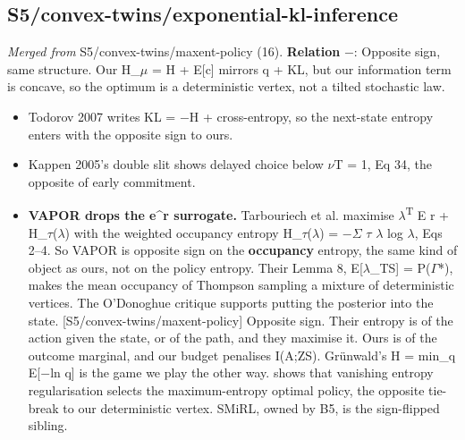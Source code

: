 \documentclass[10pt]{article}
\begin{document}
\subsection{S5/convex-twins/exponential-kl-inference}\label{node:S5-S5-convex-twins-exponential-kl-inference}
\textit{Merged from} S5/convex-twins/maxent-policy (16). \textbf{Relation} $-$: Opposite sign, same structure. Our H\_\ensuremath{\mu} = H + E[c] mirrors q + KL, but our information term is concave, so the optimum is a deterministic vertex, not a tilted stochastic law.
\begin{itemize}[nosep,leftmargin=1.2em]
\item Todorov 2007 writes KL = \ensuremath{-}H + cross-entropy, so the next-state entropy enters with the opposite sign to ours.
\item Kappen 2005's double slit shows delayed choice below \ensuremath{\nu}T = 1, Eq 34, the opposite of early commitment.
\item \textbf{VAPOR drops the e\^{}r surrogate.} Tarbouriech et al. maximise \ensuremath{\lambda}\textsuperscript{T} E r + H\_\ensuremath{\tau}(\ensuremath{\lambda}) with the weighted occupancy entropy H\_\ensuremath{\tau}(\ensuremath{\lambda}) = \ensuremath{-}\ensuremath{\Sigma} \ensuremath{\tau} \ensuremath{\lambda} log \ensuremath{\lambda}, Eqs 2--4. So VAPOR is opposite sign on the \textbf{occupancy} entropy, the same kind of object as ours, not on the policy entropy. Their Lemma 8, E[\ensuremath{\lambda}\_TS] = P(\ensuremath{\Gamma}*), makes the mean occupancy of Thompson sampling a mixture of deterministic vertices. The O'Donoghue critique supports putting the posterior into the state. [S5/convex-twins/maxent-policy] Opposite sign. Their entropy is of the action given the state, or of the path, and they maximise it. Ours is of the outcome marginal, and our budget penalises I(A;Z\textbar{}S). Gr\"unwald's H = min\_q E[\ensuremath{-}ln q] is the game we play the other way. \citet{Jhaveri-convergence25} shows that vanishing entropy regularisation selects the maximum-entropy optimal policy, the opposite tie-break to our deterministic vertex. SMiRL, owned by B5, is the sign-flipped sibling.
\end{itemize}
\end{document}
